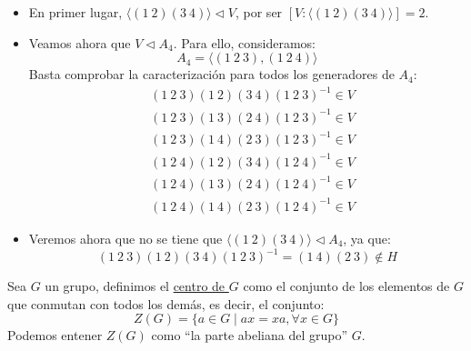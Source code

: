 \begin{ejemplo}
\begin{enumerate}
\begin{figure}[H]
            \end{figure}
            \begin{itemize}
                \item En primer lugar, $\langle (1\ 2)(3\ 4) \rangle \lhd V $, por ser $[V:\langle (1\ 2)(3\ 4) \rangle ] = 2$.
                \item Veamos ahora que $V\lhd A_4$. Para ello, consideramos:
                    \begin{equation*}
                        A_4 = \langle (1\ 2\ 3), (1\ 2\ 4) \rangle 
                    \end{equation*}
                    Basta comprobar la caracterización para todos los generadores de $A_4$:
                    \begin{align*}
                        &(1\ 2\ 3)(1\ 2)(3\ 4){(1\ 2\ 3)}^{-1} \in  V \\
                        &(1\ 2\ 3)(1\ 3)(2\ 4){(1\ 2\ 3)}^{-1} \in  V \\
                        &(1\ 2\ 3)(1\ 4)(2\ 3){(1\ 2\ 3)}^{-1} \in  V \\
                        &(1\ 2\ 4)(1\ 2)(3\ 4){(1\ 2\ 4)}^{-1} \in  V \\
                        &(1\ 2\ 4)(1\ 3)(2\ 4){(1\ 2\ 4)}^{-1} \in  V \\
                        &(1\ 2\ 4)(1\ 4)(2\ 3){(1\ 2\ 4)}^{-1} \in  V 
                    \end{align*}
                \item Veremos ahora que no se tiene que $\langle (1\ 2)(3\ 4) \rangle\lhd A_4 $, ya que:
                    \begin{equation*}
                        (1\ 2\ 3)(1\ 2)(3\ 4){(1\ 2\ 3)}^{-1} = (1\ 4)(2\ 3)\notin H
                    \end{equation*}
            \end{itemize}
    \end{enumerate}
\end{ejemplo}

\begin{definicion}[Centro]
    Sea $G$ un grupo, definimos el \underline{centro de $G$} como el conjunto de los elementos de $G$ que conmutan con todos los demás, es decir, el conjunto:
    \begin{equation*}
        Z(G) = \{a\in G \mid ax = xa, \forall x\in G\}
    \end{equation*}
Podemos entener $Z(G)$ como ``la parte abeliana del grupo'' $G$.
\end{definicion}

